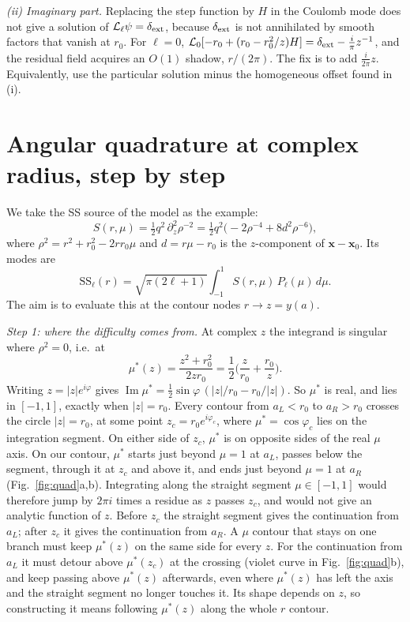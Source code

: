 \documentclass[aps,prd,twocolumn,superscriptaddress,nofootinbib,floatfix]{revtex4-2}
\renewcommand{\Im}{\operatorname{Im}}
\newcommand{\dext}{\delta_{\rm ext}}
\newcommand{\x}{\mathbf{x}}
\newcommand{\Lop}{\mathcal{L}_\ell}
\begin{document}
\emph{(ii) Imaginary part.}
Replacing the step function by $H$ in the Coulomb mode does not give a solution of $\Lop\psi=\dext$, because $\dext$ is not annihilated by smooth factors that vanish at $r_0$.
For $\ell=0$, $\mathcal L_0[-r_0+(r_0-r_0^2/z)H]=\dext-\tfrac{i}{\pi}z^{-1}$, and the residual field acquires an $O(1)$ shadow, $r/(2\pi)$.
The fix is to add $\tfrac{i}{2\pi}z$.
Equivalently, use the particular solution minus the homogeneous offset found in (i).

\section{Angular quadrature at complex radius, step by step}\label{app:quadrature}
We take the SS source of the model as the example:
\begin{equation}
S(r,\mu)=\tfrac12q^2\,\partial_z^2\rho^{-2}=\tfrac12q^2\big(-2\rho^{-4}+8d^2\rho^{-6}\big),
\end{equation}
where $\rho^2=r^2+r_0^2-2rr_0\mu$ and $d=r\mu-r_0$ is the $z$-component of $\x-\x_0$.
Its modes are
\begin{equation}
\mathrm{SS}_\ell(r)=\sqrt{\pi(2\ell+1)}\int_{-1}^{1}S(r,\mu)\,P_\ell(\mu)\,d\mu.
\label{eq:SSmode}
\end{equation}
The aim is to evaluate this at the contour nodes $r\to z=y(a)$.

\emph{Step 1: where the difficulty comes from.}
At complex $z$ the integrand is singular where $\rho^2=0$, i.e.\ at
\begin{equation}
\mu^*(z)=\frac{z^2+r_0^2}{2zr_0}=\frac12\Big(\frac{z}{r_0}+\frac{r_0}{z}\Big).
\end{equation}
Writing $z=|z|e^{i\varphi}$ gives $\Im\mu^*=\tfrac12\sin\varphi\,(|z|/r_0-r_0/|z|)$.
So $\mu^*$ is real, and lies in $[-1,1]$, exactly when $|z|=r_0$.
Every contour from $a_L<r_0$ to $a_R>r_0$ crosses the circle $|z|=r_0$, at some point $z_c=r_0e^{i\varphi_c}$, where $\mu^*=\cos\varphi_c$ lies on the integration segment.
On either side of $z_c$, $\mu^*$ is on opposite sides of the real $\mu$ axis.
On our contour, $\mu^*$ starts just beyond $\mu=1$ at $a_L$, passes below the segment, through it at $z_c$ and above it, and ends just beyond $\mu=1$ at $a_R$ (Fig.~\ref{fig:quad}a,b).
Integrating along the straight segment $\mu\in[-1,1]$ would therefore jump by $2\pi i$ times a residue as $z$ passes $z_c$, and would not give an analytic function of $z$.
Before $z_c$ the straight segment gives the continuation from $a_L$; after $z_c$ it gives the continuation from $a_R$.
A $\mu$ contour that stays on one branch must keep $\mu^*(z)$ on the same side for every $z$.
For the continuation from $a_L$ it must detour above $\mu^*(z_c)$ at the crossing (violet curve in Fig.~\ref{fig:quad}b), and keep passing above $\mu^*(z)$ afterwards, even where $\mu^*(z)$ has left the axis and the straight segment no longer touches it.
Its shape depends on $z$, so constructing it means following $\mu^*(z)$ along the whole $r$ contour.
\end{document}
